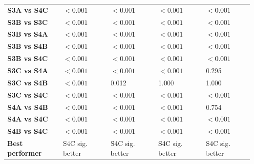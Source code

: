 \begin{table}[H]
{\begin{tabular}{lllll}
        \textbf{S3A vs S4C} & $< 0.001$ & $< 0.001$ & $< 0.001$ & $< 0.001$ \\
        \textbf{S3B vs S3C} & $< 0.001$ & $< 0.001$ & $< 0.001$ & $< 0.001$ \\
        \textbf{S3B vs S4A} & $< 0.001$ & $< 0.001$ & $< 0.001$ & $< 0.001$ \\
        \textbf{S3B vs S4B} & $< 0.001$ & $< 0.001$ & $< 0.001$ & $< 0.001$ \\
        \textbf{S3B vs S4C} & $< 0.001$ & $< 0.001$ & $< 0.001$ & $< 0.001$ \\
        \textbf{S3C vs S4A} & $< 0.001$ & $< 0.001$ & $< 0.001$ & 0.295 \\
        \textbf{S3C vs S4B} & $< 0.001$ & 0.012 & 1.000 & 1.000 \\
        \textbf{S3C vs S4C} & $< 0.001$ & $< 0.001$ & $< 0.001$ & $< 0.001$ \\
        \textbf{S4A vs S4B} & $< 0.001$ & $< 0.001$ & $< 0.001$ & 0.754 \\
        \textbf{S4A vs S4C} & $< 0.001$ & $< 0.001$ & $< 0.001$ & $< 0.001$ \\
        \textbf{S4B vs S4C} & $< 0.001$ & $< 0.001$ & $< 0.001$ & $< 0.001$ \\
        \textbf{Best performer} & S4C sig. better & S4C sig. better & S4C sig. better & S4C sig. better \\
        \bottomrule
    \end{tabular}}
\end{table}
